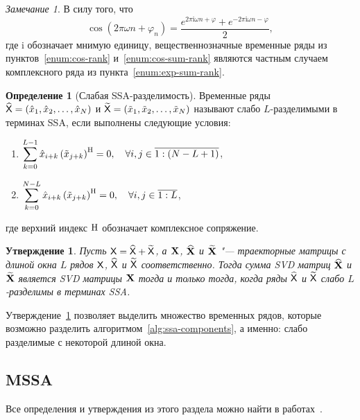 \documentclass[specialist,
  substylefile=spbu_report.rtx,
subf,href,colorlinks=true, 12pt]{disser}
\theoremstyle{plain}
\newtheorem{statement}{Утверждение}[section]
\theoremstyle{definition}
\newtheorem{definition}{Определение}[section]
\theoremstyle{remark}
\newtheorem{remark}{Замечание}[section]
\newcommand{\iu}{\mathrm{i}}
\begin{document}
\begin{remark}\label{remark:cos-exp}
  В силу того, что
  \[
    \cos(2 \pi \omega n + \varphi_n) =
    \frac{e^{2\pi \iu \omega n + \varphi} + e^{-2\pi \iu \omega n -
    \varphi}}{2},
  \]
  где $\iu$ обозначает мнимую единицу,
  вещественнозначные временные ряды из
  пунктов~\ref{enum:cos-rank} и~\ref{enum:cos-sum-rank} являются
  частным случаем комплексного ряда из пункта~\ref{enum:exp-sum-rank}.
\end{remark}

\begin{definition}[Слабая SSA-разделимость]
  \label{def:ssa-separability}
  Временные ряды $\widehat{\mathsf{X}} = (\hat{x}_1, \hat{x}_2, \ldots, \hat{x}_N)$ и
  $\widetilde{\mathsf{X}} = (\tilde{x}_1, \tilde{x}_2, \ldots, \tilde{x}_N)$
  называют слабо $L$-разделимыми в терминах
  SSA, если выполнены следующие условия:
  \begin{enumerate}
    \item $\displaystyle \sum_{k=0}^{L - 1} \hat{x}_{i +
      k}\left(\tilde{x}_{j + k}\right)^{\mathrm{H}} = 0,
      \quad \forall i, j \in \overline{1:(N - L + 1)}$,
    \item $\displaystyle \sum_{k=0}^{N - L}\hat{x}_{i +
      k}\left(\tilde{x}_{j + k}\right)^{\mathrm{H}} = 0,
      \quad \forall i, j \in \overline{1:L}$,
  \end{enumerate}
  где верхний индекс $\mathrm{H}$ обозначает комплексное сопряжение.
\end{definition}

\begin{statement}
  \label{state:ssa-separability}
  Пусть $\mathsf{X} = \widehat{\mathsf{X}} + \widetilde{\mathsf{X}}$, а $\mathbf{X}$,
  $\widehat{\mathbf{X}}$ и $\widetilde{\mathbf{X}}$ "--- траекторные
  матрицы с длиной окна $L$ рядов $\mathsf{X}$, $\widehat{\mathsf{X}}$ и
  $\widetilde{\mathsf{X}}$ соответственно.
  Тогда сумма \emph{SVD} матриц $\widehat{\mathbf{X}}$ и $\widetilde{\mathbf{X}}$
  является \emph{SVD} матрицы $\mathbf{X}$ тогда и только тогда, когда
  ряды $\widehat{\mathsf{X}}$ и $\widetilde{\mathsf{X}}$ слабо $L$-разделимы в
  терминах \emph{SSA}.
\end{statement}

Утверждение~\ref{state:ssa-separability} позволяет выделить множество
временных рядов, которые возможно
разделить алгоритмом~\ref{alg:ssa-components}, а именно: слабо
разделимые с некоторой длиной окна.

\subsection{MSSA}\label{subsec:mssa}
Все определения и утверждения из этого раздела можно найти в
работах~\cite{mssa, mssa2, ssa-2020}.
\end{document}
